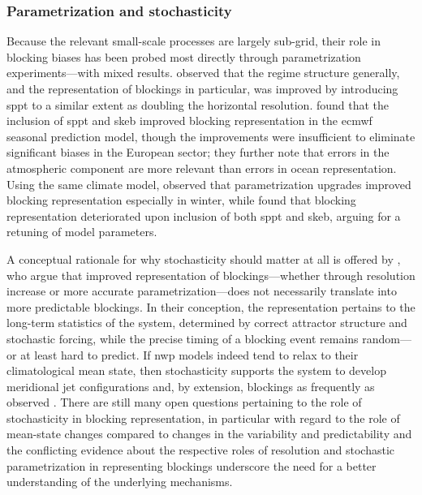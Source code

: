 \subsubsection{Parametrization and stochasticity}

Because the relevant small-scale processes are largely sub-grid, their role in
blocking biases has been probed most directly through parametrization
experiments---with mixed results. \textcite{dawsonSimulatingWeatherRegimes2015}
observed that the regime structure generally, and the representation of
blockings in particular, was improved by introducing \gls{sppt} to a similar
extent as doubling the horizontal resolution.
\textcite{daviniRepresentationWinterNorthern2021} found that the inclusion of
\gls{sppt} and \gls{skeb} improved blocking representation in the \gls{ecmwf}
seasonal prediction model, though the improvements were insufficient to
eliminate significant biases in the European sector; they further note that
errors in the atmospheric component are more relevant than errors in ocean
representation. Using the same climate model,
\textcite{hartungResolutionPhysicsAtmosphere2017} observed that parametrization
upgrades improved blocking representation especially in winter, while
\textcite{filippucciImpactStochasticPhysics2024} found that blocking
representation deteriorated upon inclusion of both \gls{sppt} and \gls{skeb},
arguing for a retuning of model parameters.

A conceptual rationale for why stochasticity should matter at all is offered by
\textcite{molteniRegimesWintertimeCirculation1990}, who argue that improved
representation of blockings---whether through resolution increase or more
accurate parametrization---does not necessarily translate into more predictable
blockings. In their conception, the representation pertains to the long-term
statistics of the system, determined by correct attractor structure and
stochastic forcing, while the precise timing of a blocking event remains
random---or at least hard to predict. If \gls{nwp} models indeed tend to relax
to their climatological mean state, then stochasticity supports the
system to develop meridional jet
configurations and, by extension, blockings as frequently as observed
\parencite{weisheimerAddressingModelError2014,
    palmerRepresentingModelUncertainty2005,
    jungInfluenceStochasticParameterization2005}. There are still many open
questions pertaining to the role of stochasticity in blocking representation,
in particular with regard to the role of mean-state changes compared to
changes in the variability and predictability and the conflicting evidence
about the respective roles of resolution and stochastic parametrization in
representing blockings underscore the need for a better understanding of the
underlying mechanisms.

